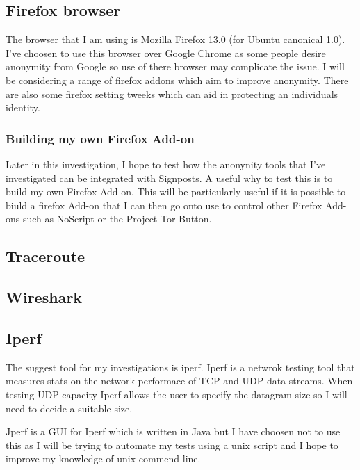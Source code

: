 \documentclass[12pt,a4paper,oneside]{article}
\begin{document}
\subsection{Firefox browser}
The browser that I am using is Mozilla Firefox 13.0 (for Ubuntu canonical 1.0). I've choosen to use this browser over Google Chrome as some people desire anonymity from Google so use of there browser may complicate the issue. I will be considering a range of firefox addons which aim to improve anonymity. There are also some firefox setting tweeks which can aid in protecting an individuals identity.

\subsubsection{Building my own Firefox Add-on}


Later in this investigation, I hope to test how the anonynity tools that I've investigated can be integrated with Signposts. A useful why to test this is to build my own Firefox Add-on. This will be particularly useful if it is possible to biuld a firefox Add-on that I can then go onto use to control other Firefox Add-ons such as NoScript or the Project Tor Button.


\subsection{Traceroute}
\subsection{Wireshark}
\subsection{Iperf}
The suggest tool for my investigations is iperf. Iperf is a netwrok testing tool that measures stats on the network performace of TCP and UDP data streams.  When testing UDP capacity Iperf allows the user to specify the datagram size so I will need to decide a suitable size. 

Jperf is a GUI for Iperf which is written in Java but I have choosen not to use this as I will be trying to automate my tests using a unix script and I hope to improve my knowledge of unix commend line.
\end{document}
